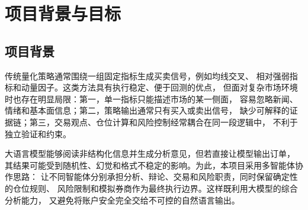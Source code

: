 \documentclass[a4paper,11pt]{article}
\begin{document}
\begin{abstract}
本文设计并实现了一套面向多标的模拟证券交易的 Top-Down 智能决策系统。
系统以 LangGraph 为状态化编排框架，采用\textbf{五层耦合架构}
（工具层→规则层→记忆层→LLM层→约束层），将全市场股票池构建、
综合趋势评分、行业轮动筛选、个股精选、权重分配与硬风控执行
组织为可追踪的决策流水线。

系统的核心创新在于\textbf{规则不替代 LLM，而是武装 LLM}：
规则层产出趋势评分、RS 排序、K 线特征向量、情绪快照等确定性特征，
记忆层通过向量检索召回历史相似场景的成败经验并拼接为经验课程，
LLM 层在拿到全套结构化情报后做语义判断，约束层将 LLM 建议复核为安全订单。
经验学习闭环（决策记录→回填超额收益→相似度召回→注入后续决策）
使 Agent 能够越跑越聪明。

系统支持 Synthetic、CSV、AkShare、Tushare 和 yfinance 等行情来源，
具备动态 A 股股票池、28 项 unittest 合约测试、RAG 知识库、
交易记忆和 Web 可视化功能。基于 2024 年 9 月 23 日至 10 月 8 日
（``924 政策牛''）的回测实验，deepseek LLM 模式取得 27.61\% 的总收益，
相对沪深 300（+32.47\%）的超额收益为 $-4.86\%$，
较 offline 规则模式（超额 $-12.98\%$）提升了 8.12 个百分点，
验证了 LLM 在行业聚焦与个股精选上的增量价值。

\noindent\textbf{关键词：}多智能体系统；LangGraph；五层耦合架构；
Top-Down 选股；经验学习闭环；大语言模型；事件驱动回测
\end{abstract}

\section{项目背景与目标}

\subsection{项目背景}

传统量化策略通常围绕一组固定指标生成买卖信号，例如均线交叉、
相对强弱指标和动量因子。这类方法具有执行稳定、便于回测的优点，
但面对复杂市场环境时也存在明显局限：第一，单一指标只能描述市场的某一侧面，
容易忽略新闻、情绪和基本面信息；第二，策略输出通常只有买入或卖出信号，
缺少可解释的证据链；第三，交易观点、仓位计算和风险控制经常耦合在同一段逻辑中，
不利于独立验证和约束。

大语言模型能够阅读非结构化信息并生成分析意见，但若直接让模型输出订单，
其结果可能受到随机性、幻觉和格式不稳定的影响。为此，本项目采用多智能体协作思路：
让不同智能体分别承担分析、辩论、交易和风险职责，同时保留确定性的仓位规则、
风险限制和模拟券商作为最终执行边界。这样既利用大模型的综合分析能力，
又避免将账户安全完全交给不可控的自然语言输出。
\end{document}

